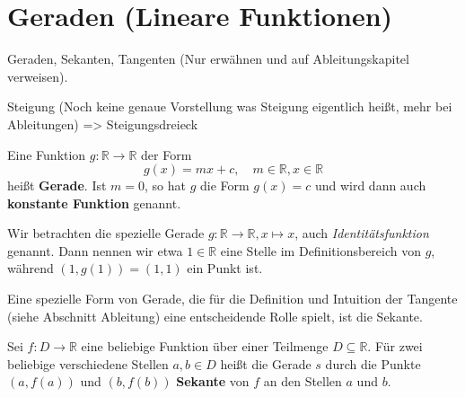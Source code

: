 \section{Geraden (Lineare Funktionen)}
Geraden, Sekanten, Tangenten (Nur erwähnen und auf Ableitungskapitel verweisen). 

Steigung (Noch keine genaue Vorstellung was Steigung eigentlich heißt, mehr bei Ableitungen) => Steigungsdreieck
\begin{definition}
    Eine Funktion \(g:\mathbb R \to \mathbb R\) der Form 
    \begin{equation*}
        g(x) = mx + c, \quad m \in \mathbb R, x \in \mathbb R
    \end{equation*}
    heißt \textbf{Gerade}. Ist \(m=0\), so hat \(g\) die Form \(g(x) = c\) und wird dann auch \textbf{konstante Funktion} genannt. 
\end{definition}

\begin{example}
    Wir betrachten die spezielle Gerade \(g:\mathbb R \to \mathbb R, x \mapsto x\), auch \textit{Identitätsfunktion} genannt. Dann nennen wir etwa \(1\in \mathbb R\) eine Stelle im Definitionsbereich von \(g\), während \((1,g(1)) = (1,1)\) ein Punkt ist. 
\end{example}

Eine spezielle Form von Gerade, die für die Definition und Intuition der Tangente (siehe Abschnitt Ableitung) eine entscheidende Rolle spielt, ist die Sekante.
\begin{definition}[Sekante]
    Sei \(f: D \to \mathbb R\) eine beliebige Funktion über einer Teilmenge \(D\subseteq \mathbb R\). Für zwei beliebige verschiedene Stellen $a, b \in D$ heißt die Gerade \(s\) durch die Punkte \((a,f(a))\) und \((b,f(b))\) \textbf{Sekante} von \(f\) an den Stellen \(a\) und \(b\). 
\end{definition}

